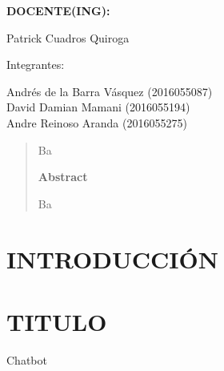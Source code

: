 \documentclass[12pt,letterpaper]{article}
\begin{document}
\begin{titlepage}
\begin{center}
\vspace*{0.3in}
\begin{Large}
\textbf{DOCENTE(ING):} \\
\end{Large}

\vspace*{0.1in}
\begin{large}
 Patrick Cuadros Quiroga\\
\end{large}

\vspace*{0.2in}
\vspace*{0.1in}
\begin{large}
Integrantes: \\
\begin{flushleft}

Andrés de la Barra Vásquez            	\hfill	(2016055087) \\
David Damian Mamani 			\hfill	(2016055194) \\
Andre Reinoso Aranda 			\hfill	(2016055275) \\

\end{flushleft}
\end{large}
\end{center}

\end{titlepage}


\tableofcontents %
\thispagestyle{empty} %
\newpage
\setcounter{page}{1} %

\begin{abstract}

Ba


\begin{center}
\textbf{Abstract}
\end{center}
Ba

\end{abstract}
\newpage
\section{INTRODUCCIÓN} 



\newpage
\section{TITULO}
	\par Chatbot
\end{document}
